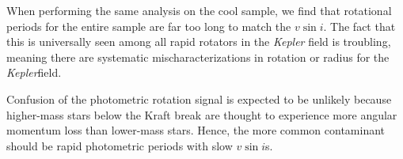 \documentclass[manuscript]{aastex6}
\newcommand{\vsini}{\ensuremath{v \sin i}}
\newcommand{\Kepler}{\mbox{\textit{Kepler}}}
\begin{document}
When performing the same analysis on the cool sample, we find that rotational
periods for the entire sample are far too long to match the \vsini{}. The fact
that this is universally seen among all rapid rotators in the \Kepler{} field
is troubling, meaning there are systematic mischaracterizations in rotation or
radius for the \Kepler field.

Confusion of the photometric rotation signal is expected to be unlikely because
higher-mass stars below the Kraft break are thought to experience more angular
momentum loss than lower-mass stars. Hence, the more common contaminant should
be rapid photometric periods with slow \vsini{}s.





\end{document}
